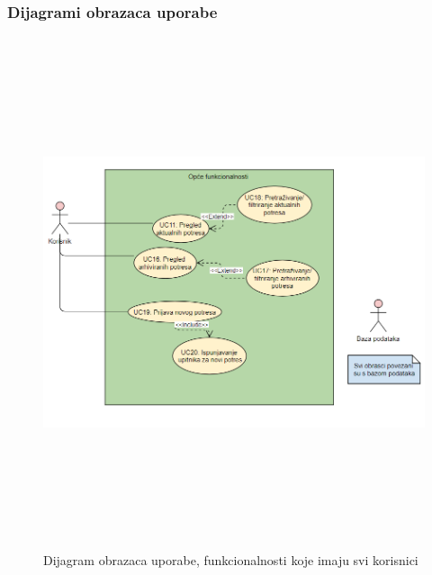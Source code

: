 				\subsubsection{Dijagrami obrazaca uporabe}
					
				\begin{figure}[H]
					\includegraphics[width=\textwidth, height = 15cm]{slike/prvinovi.PNG} 
					 \caption{Dijagram obrazaca uporabe, funkcionalnosti koje imaju svi korisnici}
					  \label{fig:obrasci1} 
				  \end{figure}
				  
